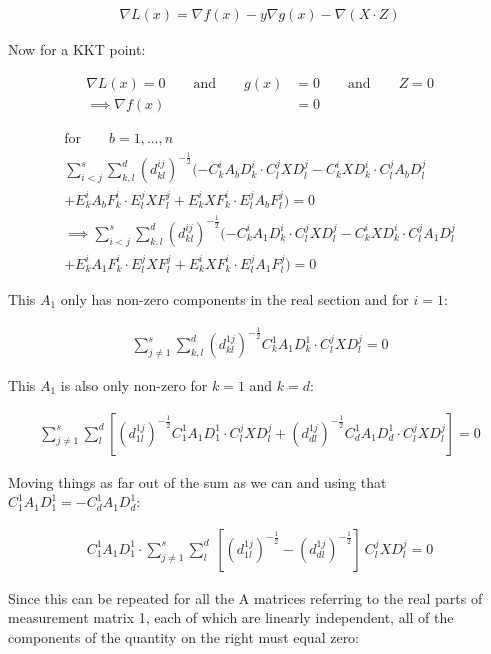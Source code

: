 \documentclass{article}
\begin{document}
\begin{align}
	\nabla L(x) = \nabla f(x) - y \nabla g(x) - \nabla (X \cdot Z)
\end{align}

Now for a KKT point:

\begin{align}
	\nabla L(x) = 0 \qquad \text{and} \qquad g(x) &= 0 \qquad \text{and} \qquad Z = 0 \\
	\implies \nabla f(x) &= 0
\end{align}

\begin{align}
	\text{for} \qquad b = {1,...,n} \\
	\sum_{i<j}^s \sum_{k,l}^d (d_{kl}^{ij})^{-\frac{1}{2}}(-C_k^i A_b D_k^i \cdot C_l^j X D_l^j - C_k^i X D_k^i \cdot C_l^j A_b D_l^j \\
	+ E_k^i A_b F_k^i \cdot E_l^j X F_l^j + E_k^i X F_k^i \cdot E_l^j A_b F_l^j)  = 0 \\
	\implies \sum_{i<j}^s \sum_{k,l}^d (d_{kl}^{ij})^{-\frac{1}{2}}(-C_k^i A_1 D_k^i \cdot C_l^j X D_l^j - C_k^i X D_k^i \cdot C_l^j A_1 D_l^j \\
	+ E_k^i A_1 F_k^i \cdot E_l^j X F_l^j + E_k^i X F_k^i \cdot E_l^j A_1 F_l^j)  = 0
\end{align}

This $A_1$ only has non-zero components in the real section and for $i = 1$:

\begin{align}
	\sum_{j\ne 1}^s \sum_{k,l}^d (d_{kl}^{1j})^{-\frac{1}{2}} C_k^1 A_1 D_k^1 \cdot C_l^j X D_l^j = 0
\end{align}

This $A_1$ is also only non-zero for $k = 1$ and $k = d$:

\begin{align}
	\sum_{j\ne 1}^s \sum_{l}^d [(d_{1l}^{1j})^{-\frac{1}{2}} C_1^1 A_1 D_1^1 \cdot C_l^j X D_l^j + (d_{dl}^{1j})^{-\frac{1}{2}} C_d^1 A_1 D_d^1 \cdot C_l^j X D_l^j ] = 0
\end{align}

Moving things as far out of the sum as we can and using that $C_1^1 A_1 D_1^1 = -C_d^1 A_1 D_d^1$:

\begin{align}
	C_1^1 A_1 D_1^1 \cdot \sum_{j\ne 1}^s \sum_{l}^d ~ [ (d_{1l}^{1j})^{-\frac{1}{2}} - (d_{dl}^{1j})^{-\frac{1}{2}}] ~ C_l^j X D_l^j = 0
\end{align}

Since this can be repeated for all the A matrices referring to the real parts of measurement matrix 1, each of which are linearly independent, all of the components of the quantity on the right must equal zero:
\end{document}
